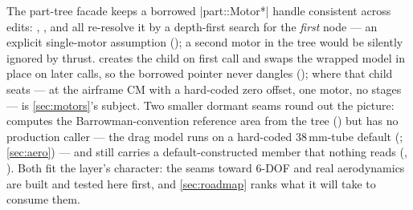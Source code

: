 The part-tree facade keeps a borrowed \cppinline|part::Motor*| handle consistent across edits:
, , and  all re-resolve it by a depth-first search
for the \emph{first}  node --- an explicit single-motor assumption
(); a second motor in the tree would be silently ignored by thrust.
 creates the  child on first call and swaps the wrapped model
in place on later calls, so the borrowed pointer never dangles ();
where that child seats --- at the airframe CM with a hard-coded zero offset, one motor, no stages
--- is \cref{sec:motors}'s subject. Two smaller dormant seams
round out the picture:  computes the Barrowman-convention
reference area from the tree () but has no production caller ---
the drag model runs on a hard-coded 38\,mm-tube default (;
\cref{sec:aero}) --- and  still carries a default-constructed
 member that nothing reads (,
). Both fit the layer's character: the seams toward 6-DOF and real
aerodynamics are built and tested here first, and \cref{sec:roadmap} ranks what it will take to
consume them.
